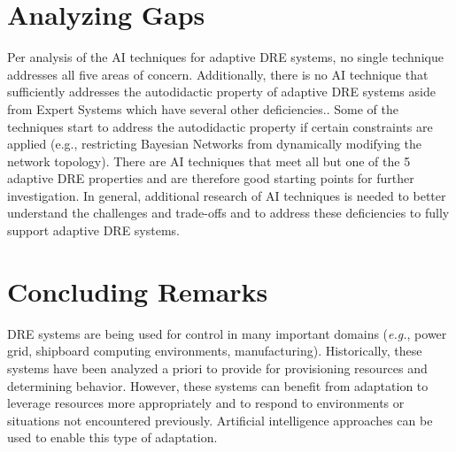 \documentclass[conference]{IEEEtran}
\begin{document}
\section{Analyzing Gaps}
\label{gap-analysis}
Per analysis of the AI techniques for adaptive DRE systems, no single technique addresses all five areas of concern. Additionally, there is no AI technique that sufficiently addresses the autodidactic property of adaptive DRE systems aside from Expert Systems which have several other deficiencies.. Some of the techniques start to address the autodidactic property if certain constraints are applied (e.g., restricting Bayesian Networks from dynamically modifying the network topology).
There are AI techniques that meet all but one of the 5 adaptive DRE properties and are therefore good starting points for further investigation. In general, additional research of AI techniques is needed to better understand the challenges and trade-offs and to address these deficiencies to fully support adaptive DRE systems.


\section{Concluding Remarks}
\label{summary}
DRE systems are being used for control in many important domains (\emph{e.g.}, power grid, shipboard computing environments, manufacturing). Historically, these systems have been analyzed a priori to provide for provisioning resources and determining behavior. However, these systems can benefit from adaptation to leverage resources more appropriately and to respond to environments or situations not encountered previously. Artificial intelligence approaches can be used to enable this type of adaptation.
\end{document}
